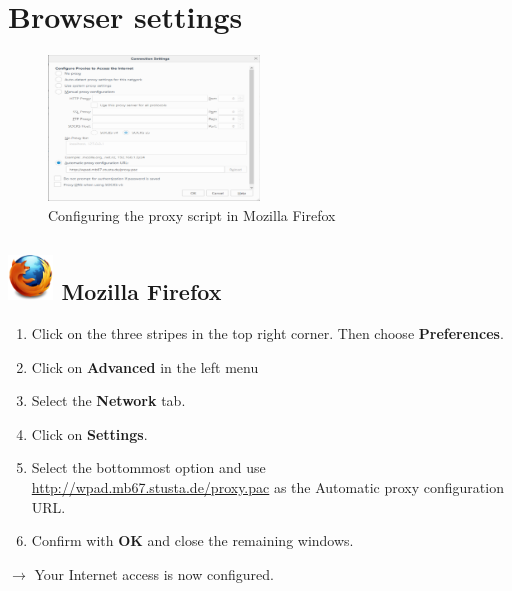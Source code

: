 \documentclass[a4paper,12pt]{scrartcl}
\newcommand{\optemph}[1]{\textbf{#1}}
\begin{document}
\newpage

\section*{Browser settings}

\begin{figure}
  \vspace{-30pt}
  \begin{center}
    \includegraphics[width=0.5\textwidth,keepaspectratio]{Bilder/Proxy_Firefox_EN_mb}
  \end{center}
  \caption{Configuring the proxy script in Mozilla Firefox}
\end{figure}

\subsection*{\includegraphics[height=1.2cm,keepaspectratio]{Bilder/Firefox_35_logo} Mozilla Firefox}
\begin{enumerate}
	\item Click on the three stripes in the top right corner. Then choose \optemph{Preferences}.
	\item Click on \optemph{Advanced} in the left menu
	\item Select the \optemph{Network} tab.
	\item Click on \optemph{Settings}.
    \item Select the bottommost option and use \\ \url{http://wpad.mb67.stusta.de/proxy.pac} as the Automatic proxy configuration URL.
	\item Confirm with \optemph{OK} and close the remaining windows.
\end{enumerate}
$\rightarrow$ Your Internet access is now configured.
\end{document}
